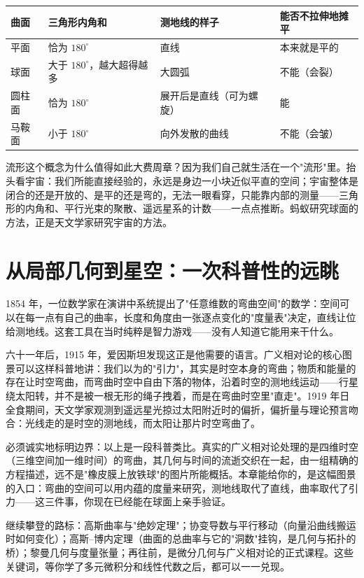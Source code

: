 \begin{table}[h]
\centering
\begin{tabular}{llll}
\toprule
曲面 & 三角形内角和 & 测地线的样子 & 能否不拉伸地摊平 \\
\midrule
平面 & 恰为 $180^\circ$ & 直线 & 本来就是平的 \\
球面 & 大于 $180^\circ$，越大超得越多 & 大圆弧 & 不能（会裂） \\
圆柱面 & 恰为 $180^\circ$ & 展开后是直线（可为螺旋） & 能 \\
马鞍面 & 小于 $180^\circ$ & 向外发散的曲线 & 不能（会皱） \\
\bottomrule
\end{tabular}
\end{table}

流形这个概念为什么值得如此大费周章？因为我们自己就生活在一个"流形"里。抬头看宇宙：我们所能直接经验的，永远是身边一小块近似平直的空间；宇宙整体是闭合的还是开放的、是平的还是弯的，无法一眼看穿，只能靠内部的测量——三角形的内角和、平行光束的聚散、遥远星系的计数——一点点推断。蚂蚁研究球面的方法，正是天文学家研究宇宙的方法。

\section{从局部几何到星空：一次科普性的远眺}

1854 年，一位数学家在演讲中系统提出了"任意维数的弯曲空间"的数学：空间可以在每一点有自己的曲率，长度和角度由一张逐点变化的"度量表"决定，直线让位给测地线。这套工具在当时纯粹是智力游戏——没有人知道它能用来干什么。

六十一年后，1915 年，爱因斯坦发现这正是他需要的语言。广义相对论的核心图景可以这样科普地讲：我们以为的"引力"，其实是时空本身的弯曲；物质和能量的存在让时空弯曲，而弯曲时空中自由下落的物体，沿着时空的测地线运动——行星绕太阳转，并不是被一根无形的绳子拽着，而是在弯曲时空里"直走"。1919 年日全食期间，天文学家观测到遥远星光掠过太阳附近时的偏折，偏折量与理论预言吻合：光线走的是时空的测地线，而太阳让那片时空弯曲了。

必须诚实地标明边界：以上是一段科普类比。真实的广义相对论处理的是四维时空（三维空间加一维时间）的弯曲，其几何与时间的流逝交织在一起，由一组精确的方程描述，远不是"橡皮膜上放铁球"的图片所能概括。本章能给你的，是这幅图景的入口：弯曲的空间可以用内蕴的度量来研究，测地线取代了直线，曲率取代了引力——这三件事，你现在已经能在球面上亲手验证。

\begin{pandeng}
继续攀登的路标：高斯曲率与"绝妙定理"；协变导数与平行移动（向量沿曲线搬运时如何变化）；高斯–博内定理（曲面的总曲率与它的"洞数"挂钩，是几何与拓扑的桥）；黎曼几何与度量张量；再往前，是微分几何与广义相对论的正式课程。这些关键词，等你学了多元微积分和线性代数之后，都可以一一兑现。
\end{pandeng}

